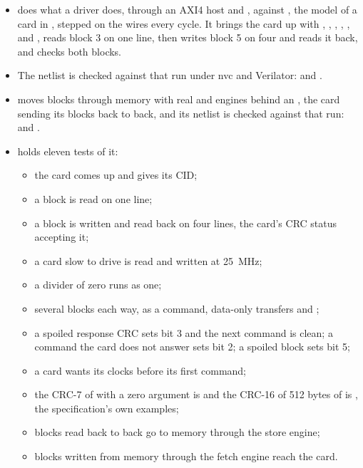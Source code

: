 \begin{itemize}
\item {} does what a driver does, through an AXI4 host and
, against , the model of a card in ,
stepped on the wires every cycle. It brings the card up with
, , , , ,
 and , reads block 3 on one line, then writes
block 5 on four and reads it back, and checks both blocks.
\item The netlist is checked against that run under nvc and
Verilator:  and
.
\item {} moves blocks through memory with real
 and 
engines behind an , the card sending its blocks back to
back, and its netlist is checked against that run:
 and
.
\item {} holds eleven tests of it:
\begin{itemize}
\item the card comes up and gives its CID;
\item a block is read on one line;
\item a block is written and read back on four lines, the card's CRC
status accepting it;
\item a card slow to drive is read and written at 25~MHz;
\item a divider of zero runs as one;
\item several blocks each way, as a command, data-only transfers and
;
\item a spoiled response CRC sets bit 3 and the next command is
clean; a command the card does not answer sets bit 2; a spoiled block
sets bit 5;
\item a card wants its clocks before its first command;
\item the CRC-7 of  with a zero argument is  and
the CRC-16 of 512 bytes of  is , the
specification's own examples;
\item blocks read back to back go to memory through the store engine;
\item blocks written from memory through the fetch engine reach the
card.
\end{itemize}
\end{itemize}

